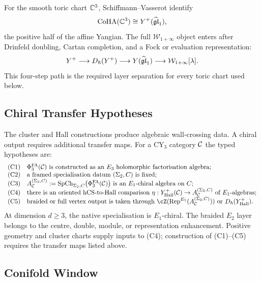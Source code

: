 For the smooth toric chart $\mathbb{C}^3$, Schiffmann--Vasserot identify
\[
  \mathrm{CoHA}(\mathbb{C}^3)\cong
  Y^{+}(\widehat{\mathfrak{gl}}_1),
\]
the positive half of the affine Yangian. The full
$\mathcal W_{1+\infty}$ object enters after Drinfeld doubling, Cartan
completion, and a Fock or evaluation representation:
\[
  Y^{+}
  \longrightarrow
  D_\hbar(Y^{+})
  \longrightarrow
  Y(\widehat{\mathfrak{gl}}_1)
  \longrightarrow
  \mathcal W_{1+\infty}[\lambda].
\]
This four-step path is the required layer separation for every toric
chart used below.

\subsection*{Chiral Transfer Hypotheses}
\label{sec:chiral-transfer-hypotheses}

The cluster and Hall constructions produce algebraic wall-crossing
data. A chiral output requires additional transfer maps. For a
CY$_3$ category $\mathcal{C}$ the typed hypotheses are:
\[
\begin{array}{ll}
\mathrm{(C1)}&
  \PhiFA_3(\cC) \text{ is constructed as an } E_3
  \text{ holomorphic factorisation algebra;}\\
\mathrm{(C2)}&
  \text{a framed specialisation datum }(\Sigma_2,C)
  \text{ is fixed;}\\
\mathrm{(C3)}&
  A_{\cC}^{(\Sigma_2,C)}
  :=
  \SpCh_{\Sigma_2,C}\bigl(\PhiFA_3(\cC)\bigr)
  \text{ is an } E_{1}\text{-chiral algebra on } C;\\
\mathrm{(C4)}&
  \text{there is an oriented hCS-to-Hall comparison }
  \eta:
  \Yplus_{\mathrm{Hall}}(\cC)
  \to A_{\cC}^{(\Sigma_2,C)}
  \text{ of } E_{1}\text{-algebras;}\\
\mathrm{(C5)}&
  \text{braided or full vertex output is taken through }
  \cZ(\Rep^{E_{1}}(A_{\cC}^{(\Sigma_2,C)}))
  \text{ or }D_\hbar(\Yplus_{\mathrm{Hall}}).
\end{array}
\]
At dimension $d\ge3$, the native specialisation is $E_{1}$-chiral. The
braided $E_{2}$ layer belongs to the centre, double, module, or
representation enhancement. Positive geometry and cluster charts supply
inputs to (C4); construction of (C1)--(C5) requires the transfer maps
listed above.

\subsection*{Conifold Window}
\label{sec:conifold-window}

